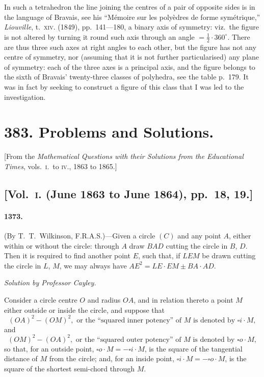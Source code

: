 \documentclass[11pt,a4paper]{article}
\begin{document}
In such a tetrahedron the line joining the centres of a pair of opposite sides
is in the language of Bravais, see his ``M\'{e}moire sur les poly\`{e}dres de forme sym\'{e}trique,''
\textit{Liouville}, t.\ \textsc{xiv}. (1849), pp.\ 141---180, a binary axis of symmetry: viz.\ the figure is
not altered by turning it round such axis through an angle $=\frac12\cdot 360^\circ$. There are thus
three such axes at right angles to each other, but the figure has not any centre of
symmetry, nor (assuming that it is not further particularised) any plane of symmetry:
each of the three axes is a principal axis, and the figure belongs to the sixth of
Bravais' twenty-three classes of polyhedra, see the table p.\ 179. It was in fact by
seeking to construct a figure of this class that I was led to the investigation.

\newpage


\section*{383. Problems and Solutions.}

[From the \textit{Mathematical Questions with their Solutions from the Educational Times}, vols.\ \textsc{i.}\ to \textsc{iv.}, 1863 to 1865.]

\subsection*{[Vol.~\textsc{i}. (June 1863 to June 1864), pp.\ 18, 19.]}

\paragraph*{1373.} (By T.~T.~Wilkinson, F.R.A.S.)---Given a circle $(C)$ and any point $A$, either
within or without the circle: through $A$ draw $BAD$ cutting the circle in $B$, $D$.
Then it is required to find another point $E$, such that, if $LEM$ be drawn cutting
the circle in $L$, $M$, we may always have $AE^2 = LE \cdot EM \pm BA \cdot AD$.

\begin{center}
\textit{Solution by Professor Cayley.}
\end{center}

Consider a circle centre $O$ and radius $OA$, and in relation thereto a point $M$
either outside or inside the circle, and suppose that
\[
(OA)^2 - (OM)^2, \text{ or the ``squared inner potency'' of $M$ is denoted by } \square i \cdot M,
\]
and
\[
(OM)^2 - (OA)^2, \text{ or the ``squared outer potency'' of $M$ is denoted by } \square o \cdot M,
\]
so that, for an outside point, $\square o \cdot M = -\square i \cdot M$, is the square of the tangential
distance of $M$ from the circle; and, for an inside point, $\square i \cdot M = -\square o \cdot M$, is the
square of the shortest semi-chord through $M$.
\end{document}
